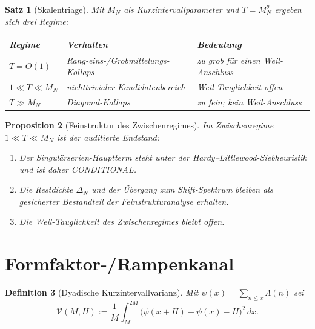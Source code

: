 \documentclass[11pt,a4paper]{amsart}
\newtheorem{theorem}{Satz}[section]
\newtheorem{proposition}[theorem]{Proposition}
\newtheorem{definition}[theorem]{Definition}
\begin{document}
\begin{theorem}[Skalentriage]\label{thm:scale-triage}
Mit $M_N$ als Kurzintervallparameter und $T=M_N^\theta$ ergeben sich drei
Regime:
\begin{center}
\small
\begin{tabular}{>{\raggedright\arraybackslash}p{}
                >{\raggedright\arraybackslash}p{}
                >{\raggedright\arraybackslash}p{}}
\toprule
Regime & Verhalten & Bedeutung\\
\midrule
$T=O(1)$
& Rang-eins-/Grobmittelungs-Kollaps
& zu grob für einen Weil-Anschluss\\
$1\ll T\ll M_N$
& nichttrivialer Kandidatenbereich
& Weil-Tauglichkeit offen\\
$T\gg M_N$
& Diagonal-Kollaps
& zu fein; kein Weil-Anschluss\\
\bottomrule
\end{tabular}
\normalsize
\end{center}
\end{theorem}

\begin{proposition}[Feinstruktur des Zwischenregimes]\label{prop:fine-structure}
Im Zwischenregime $1\ll T\ll M_N$ ist der auditierte Endstand:
\begin{enumerate}
  \item Der Singulärserien-Hauptterm steht unter der
        Hardy--Littlewood-Siebheuristik und ist daher \emph{CONDITIONAL}.
  \item Die Restdichte $\Delta_N$ und der Übergang zum Shift-Spektrum bleiben
        als gesicherter Bestandteil der Feinstrukturanalyse erhalten.
  \item Die Weil-Tauglichkeit des Zwischenregimes bleibt offen.
\end{enumerate}
\end{proposition}

\section{Formfaktor-/Rampenkanal}

\begin{definition}[Dyadische Kurzintervallvarianz]\label{def:gm-variance}
Mit $\psi(x)=\sum_{n\le x}\Lambda(n)$ sei
\[
  \mathcal V(M,H)
  :=\frac1M\int_M^{2M}
  \bigl(\psi(x+H)-\psi(x)-H\bigr)^2\,dx.
\]
\end{definition}
\end{document}
